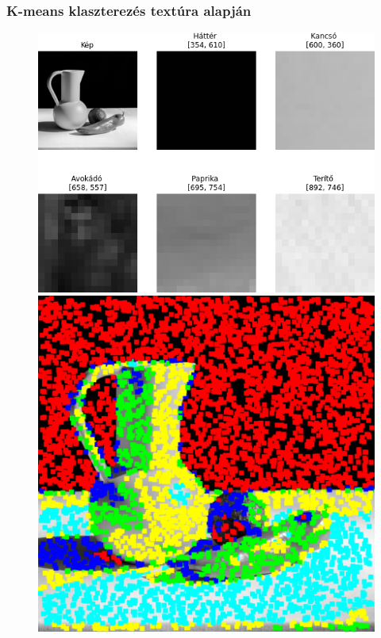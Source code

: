 \documentclass{beamer}
\begin{document}
\begin{frame}[fragile]
\frametitle{K-means klaszterezés textúra alapján}
\begin{figure}[!tbp]
  \centering
  \begin{minipage}[b]{0.55\textwidth}
    \includegraphics[width=\textwidth]{images/window_example.png}
  \end{minipage}
  \hfill
  \begin{minipage}[b]{0.4\textwidth}
    \includegraphics[width=\textwidth]{images/window_colorized.png}
  \end{minipage}
\end{figure}
\end{frame}
\end{document}
